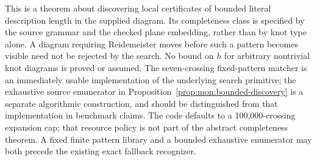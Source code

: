 This is a theorem about discovering local certificates of bounded literal
description length in the supplied diagram.  Its completeness class is
specified by the source grammar and the checked plane embedding, rather than
by knot type alone.  A diagram requiring Reidemeister moves before such a
pattern becomes visible need not be rejected by the search.  No bound on
$h$ for arbitrary nontrivial knot diagrams is proved or assumed.  The
seven-crossing fixed-pattern matcher is an immediately usable implementation
of the underlying search primitive; the exhaustive source enumerator in
Proposition~\ref{prop:mon:bounded-discovery} is a separate algorithmic
construction, and should be distinguished from that implementation in
benchmark claims. The code defaults to a 100,000-crossing expansion cap;
that resource policy is not part of the abstract completeness theorem.
A fixed finite pattern library and a bounded exhaustive
enumerator may both precede the existing exact fallback recognizer.

